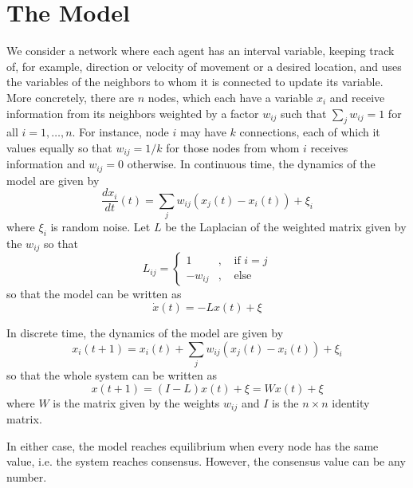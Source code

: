 \documentclass{article}
\begin{document}
\section{The Model}

We consider a network where each agent has an interval variable, keeping track of, for example, direction or velocity of movement or a desired location, and uses the variables of the neighbors to whom it is connected to update its variable.  More concretely, there are $n$ nodes, which each have a variable $x_i$ and receive information from its neighbors weighted by a factor $w_{ij}$ such that $\sum_jw_{ij}=1$ for all $i=1,\dots,n$.  For instance, node $i$ may have $k$ connections, each of which it values equally so that $w_{ij}=1/k$ for those nodes from whom $i$ receives information and $w_{ij}=0$ otherwise.  In continuous time, the dynamics of the model are given by
$$\frac{d x_i}{dt}(t)=\sum_jw_{ij}(x_j(t)-x_i(t))+\xi_i$$ where $\xi_i$ is random noise.  Let $L$ be the Laplacian of the weighted matrix given by the $w_{ij}$ so that
$$L_{ij}=\left\{\begin{array}{cccc}
1& , & \text{ if } i=j \\
-w_{ij} & , & \text{ else}
\end{array}\right.$$
so that the model can be written as 
$$\dot{x}(t)=-Lx(t)+\xi$$

In discrete time, the dynamics of the model are given by
$$x_i(t+1)=x_i(t)+\sum_jw_{ij}(x_j(t)-x_i(t))+\xi_i$$
so that the whole system can be written as
$$x(t+1)=(I-L)x(t)+\xi=Wx(t)+\xi$$
where $W$ is the matrix given by the weights $w_{ij}$ and $I$ is the $n\times n$ identity matrix.

In either case, the model reaches equilibrium when every node has the same value, i.e. the system reaches consensus.  However, the consensus value can be any number.
\end{document}
